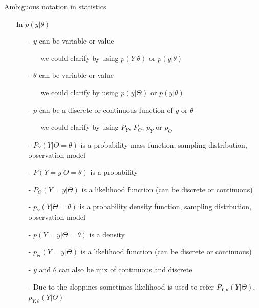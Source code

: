 \documentclass[english,t]{beamer}
\begin{document}
\begin{frame}{Ambiguous notation in statistics}
  
  \begin{itemize}
  \item[] In $p(y|\theta)$
    \pause
  \begin{itemize}
  \item[-] $y$ can be variable or value
    \begin{itemize}
    \item[] we could clarify by using $p(Y|\theta)$ or $p(y|\theta)$
    \end{itemize}
    \pause
  \item[-] $\theta$ can be variable or value
    \begin{itemize}
    \item[] we could clarify by using $p(y|\Theta)$ or $p(y|\theta)$
    \end{itemize}
    \pause
  \item[-] $p$ can be a discrete or continuous function of $y$ or $\theta$
    \begin{itemize}
    \item[] we could clarify by using $P_Y$, $P_\Theta$, $p_Y$ or $p_\Theta$
    \end{itemize}
    \pause
\item[-]
  $P_Y(Y|\Theta=\theta)$ is a probability mass function, sampling distribution, observation model
    \pause
\item[-]
$P(Y=y|\Theta=\theta)$ is a probability
    \pause
\item[-]
$P_\Theta(Y=y|\Theta)$ is a likelihood function (can be discrete or continuous)
    \pause
\item[-] $p_Y(Y|\Theta=\theta)$ is a probability density function, sampling distrbution, observation model
    \pause
\item[-] $p(Y=y|\Theta=\theta)$ is a density
    \pause
\item[-] $p_\Theta(Y=y|\Theta)$ is a likelihood function (can be discrete or continuous)
    \pause
  \item[-] $y$ and $\theta$ can also be mix of continuous and discrete
    \pause
    \item[-] Due to the sloppines sometimes likelihood is used to refer
$P_{Y,\theta}(Y|\Theta)$, $p_{Y,\theta}(Y|\Theta)$

  \end{itemize}
\end{itemize}
\end{frame}
\end{document}
